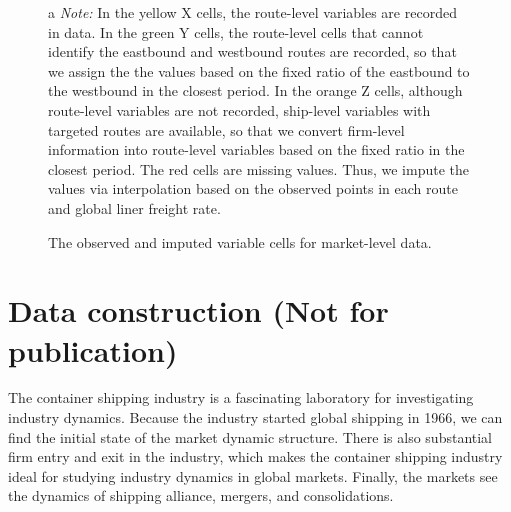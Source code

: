 \begin{landscape}
{\begin{figure}[!ht]
\begin{minipage}[b]{0.45\linewidth}
  \end{minipage}
\caption{The observed and imputed variable cells for market-level data.}
{\tiny{}
\begin{tablenotes}
\item[a]\textit{Note:} In the yellow X cells, the route-level variables are recorded in data. In the green Y cells, the route-level cells that cannot identify the eastbound and westbound routes are recorded, so that we assign the the values based on the fixed ratio of the eastbound to the westbound in the closest period. In the orange Z cells, although route-level variables are not recorded, ship-level variables with targeted routes are available, so that we convert firm-level information into route-level variables based on the fixed ratio in the closest period. The red cells are missing values. Thus, we impute the values via interpolation based on the observed points in each route and global liner freight rate.
\end{tablenotes}
}
\end{figure}
}
\end{landscape}

\section{Data construction (Not for publication)}\label{sec:data_construction}

The container shipping industry is a fascinating laboratory for investigating industry dynamics. Because the industry started global shipping in 1966, we can find the initial state of the market dynamic structure. There is also substantial firm entry and exit in the industry, which makes the container shipping industry ideal for studying industry dynamics in global markets. Finally, the markets see the dynamics of shipping alliance, mergers, and consolidations. 

